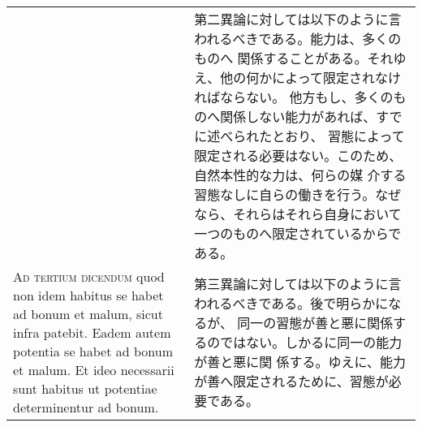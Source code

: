 \documentclass[10pt]{jsarticle} %
\begin{document}
\begin{longtable}{p{21em}p{21em}}
&

第二異論に対しては以下のように言われるべきである。能力は、多くのものへ
関係することがある。それゆえ、他の何かによって限定されなければならない。
他方もし、多くのものへ関係しない能力があれば、すでに述べられたとおり、
習態によって限定される必要はない。このため、自然本性的な力は、何らの媒
介する習態なしに自らの働きを行う。なぜなら、それらはそれら自身において
一つのものへ限定されているからである。

\\



{\scshape Ad tertium dicendum} quod non idem habitus se habet ad bonum et malum,
sicut infra patebit. Eadem autem potentia se habet ad bonum et
malum. Et ideo necessarii sunt habitus ut potentiae determinentur ad
bonum.

&

第三異論に対しては以下のように言われるべきである。後で明らかになるが、
同一の習態が善と悪に関係するのではない。しかるに同一の能力が善と悪に関
係する。ゆえに、能力が善へ限定されるために、習態が必要である。


\end{longtable}
\end{document}
